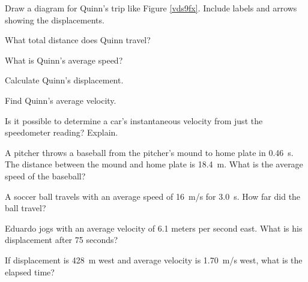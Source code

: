 \documentclass[../main.tex]{subfiles}
\begin{document}
\begin{exercise} \label{qquil7}
    Draw a diagram for Quinn's trip like Figure \ref{vds9fx}. Include labels and arrows showing the displacements.
\end{exercise}

\begin{exercise} \label{c7YaTG}
    What total distance does Quinn travel?
\end{exercise}

\begin{exercise} \label{ASXgWQ}
    What is Quinn's average speed?
\end{exercise}

\begin{exercise} \label{iG7rDo}
    Calculate Quinn's displacement.
\end{exercise}

\begin{exercise} \label{cIfbMu}
    Find Quinn's average velocity.
\end{exercise}

\cyanhrule

\begin{exercise} \label{JYqHaE}
    Is it possible to determine a car's instantaneous velocity from just the speedometer reading? Explain.
\end{exercise}

\begin{exercise} \label{EeYgx7}
A pitcher throws a baseball from the pitcher's mound to home plate in \SI{0.46}{s}. The distance between the mound and home plate is \SI{18.4}{m}. What is the average speed of the baseball?
\end{exercise}

\begin{exercise} \label{Zj7dfC}
    A soccer ball travels with an average speed of \SI{16}{m/s} for \SI{3.0}{s}. How far did the ball travel?
\end{exercise}

\cyanhrule

\vspace{1em}

\begin{exercise} \label{ix2lKL}
Eduardo jogs with an average velocity of 6.1 meters per second east. What is his displacement after 75 seconds?
\end{exercise}


\begin{exercise} \label{BI1eOB}
If displacement is \SI{428}{m} west and average velocity is \SI{1.70}{m/s} west, what is the elapsed time?
\end{exercise}
\end{document}
